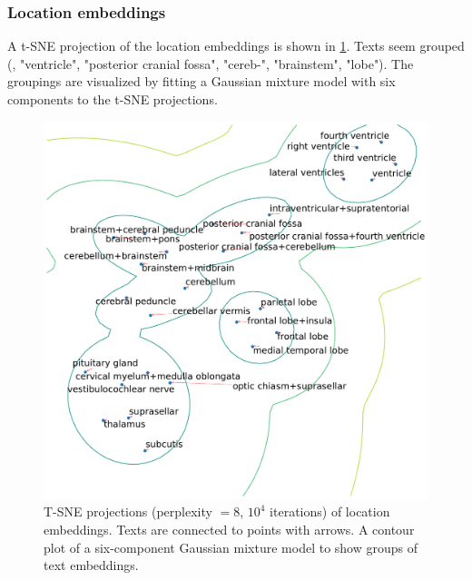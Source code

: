 \subsubsection{Location embeddings}
A t-SNE projection of the location embeddings is shown in \cref{fig:tsne-cc}.
Texts seem grouped (\eg, "ventricle", "posterior cranial fossa", "cereb-", "brainstem", "lobe").
The groupings are visualized by fitting a Gaussian mixture model with six components to the t-SNE projections.

\begin{figure}
    \centering
    \includegraphics[width=\linewidth]{pediatric-brain-tumours/images/tsne-cc.pdf}
    \caption[T-SNE projections of location embeddings]{
        T-SNE projections (perplexity $= 8$, $10^4$ iterations) of location embeddings.
        Texts are connected to points with arrows.
        A contour plot of a six-component Gaussian mixture model to show groups of text embeddings.
    }
    \label{fig:tsne-cc}
\end{figure}
